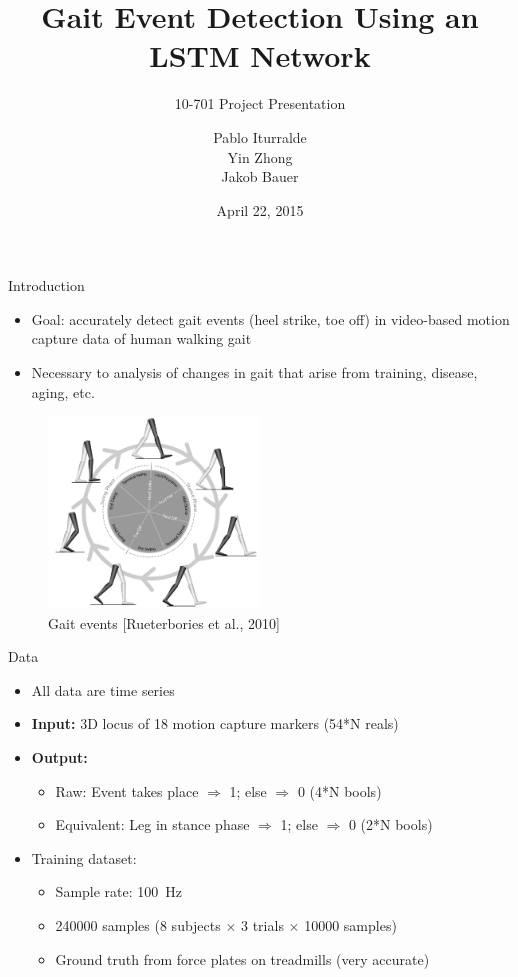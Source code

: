 \documentclass{beamer}
\title
{
    Gait Event Detection Using an LSTM Network
}
\subtitle
{
    10-701
    Project Presentation
}
\author
{
    Pablo Iturralde\\
    Yin Zhong\\
    Jakob Bauer
}
\date
{
    April 22, 2015
}
\begin{document}
\begin{frame}
  \titlepage
\end{frame}

\begin{frame}{Introduction}
    \begin{itemize}
        \item
            Goal: accurately detect gait events (heel strike, toe off) 
            in video-based motion capture data of human walking gait
        \item
            Necessary to analysis of changes in gait that arise from training,
            disease, aging, etc.
    \end{itemize}
    \begin{figure}
    \begin{center}
        \includegraphics[width=0.5\textwidth]{figures/gait_events.jpg}
        \caption{Gait events [Rueterbories et al., 2010]}
        \label{fig:gait_events}
    \end{center}
    \end{figure}
\end{frame}

\begin{frame}{Data}
    \begin{itemize}
        \item All data are time series
        \item \textbf{Input:} 3D locus of 18 motion capture markers (54*N reals)
        \item \textbf{Output:}
        \begin{itemize}
            \item Raw: Event takes place $\Rightarrow$ 1; else $\Rightarrow$ 0 (4*N bools)
            \item Equivalent: Leg in stance phase $\Rightarrow$ 1; else $\Rightarrow$ 0 (2*N bools)
        \end{itemize}
        \item Training dataset:
        \begin{itemize}
            \item Sample rate: \SI{100}{\Hz}
            \item
                \num{240000} samples
                (8 subjects $\times$ 3 trials $\times$ \num{10000} samples)
            \item
                Ground truth from force plates on treadmills (very accurate)
        \end{itemize}
    \end{itemize}
\end{frame}
\end{document}
